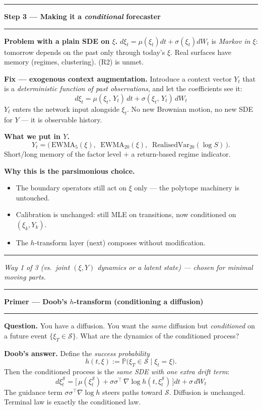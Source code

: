 \documentclass[12pt]{article}
\newcommand{\slide}[1]{%
  \par\noindent\rule{\linewidth}{1.2pt}\par\vspace{2pt}%
  {\LARGE\bfseries #1}\par\vspace{2pt}%
  \noindent\rule{\linewidth}{0.5pt}\par\vspace{8pt}}
\newcommand{\footer}[1]{\vfill\noindent\rule{\linewidth}{0.3pt}\par
  {\small\itshape #1}}
\newcommand{\Prob}{\mathbb{P}}
\newcommand{\cS}{\mathcal{S}}
\begin{document}
\slide{Step 3 --- Making it a \emph{conditional} forecaster}

\textbf{Problem with a plain SDE on $\xi$.} $d\xi_t=\mu(\xi_t)dt+\sigma(\xi_t)dW_t$
is \emph{Markov in $\xi$}: tomorrow depends on the past only through today's
$\xi$. Real surfaces have memory (regimes, clustering). (R2) is unmet.

\vspace{8pt}
\textbf{Fix --- exogenous context augmentation.} Introduce a context vector
$Y_t$ that is a \emph{deterministic function of past observations}, and let
the coefficients see it:
\[
\boxed{\;d\xi_t = \mu(\xi_t,\,Y_t)\,dt + \sigma(\xi_t,\,Y_t)\,dW_t\;}
\]
$Y_t$ enters the network input alongside $\xi_t$. No new Brownian motion,
no new SDE for $Y$ --- it is observable history.

\vspace{6pt}
\textbf{What we put in $Y$.}
\[
Y_t = \bigl(\,\mathrm{EWMA}_5(\xi),\;\; \mathrm{EWMA}_{20}(\xi),\;\;
\mathrm{RealisedVar}_{20}(\log S)\,\bigr).
\]
Short/long memory of the factor level + a return-based regime indicator.

\vspace{6pt}
\textbf{Why this is the parsimonious choice.}
\begin{itemize}
\item The boundary operators still act on $\xi$ only --- the polytope
  machinery is untouched.
\item Calibration is unchanged: still MLE on transitions, now conditioned on
  $(\xi_k,Y_k)$.
\item The $h$-transform layer (next) composes without modification.
\end{itemize}

\footer{Way 1 of 3 (vs.\ joint $(\xi,Y)$ dynamics or a latent state) --- chosen for minimal moving parts.}
\clearpage

\slide{Primer --- Doob's $h$-transform (conditioning a diffusion)}

\textbf{Question.} You have a diffusion. You want the \emph{same} diffusion
but \emph{conditioned} on a future event $\{\xi_T \in \cS\}$. What are the
dynamics of the conditioned process?

\vspace{6pt}
\textbf{Doob's answer.} Define the \emph{success probability}
\[
h(t,\xi) := \Prob\bigl(\xi_T \in \cS \;\big|\; \xi_t = \xi\bigr).
\]
Then the conditioned process is the \emph{same SDE with one extra drift term}:
\[
\boxed{\;d\xi_t^{\cS}
= \bigl[\,\mu(\xi_t^{\cS}) + \sigma\sigma^\top\,\nabla\log h(t,\xi_t^{\cS})\,\bigr]dt
+ \sigma\,dW_t\;}
\]
The guidance term $\sigma\sigma^\top\nabla\log h$ steers paths toward $\cS$.
Diffusion is unchanged. Terminal law is exactly the conditioned law.
\end{document}
